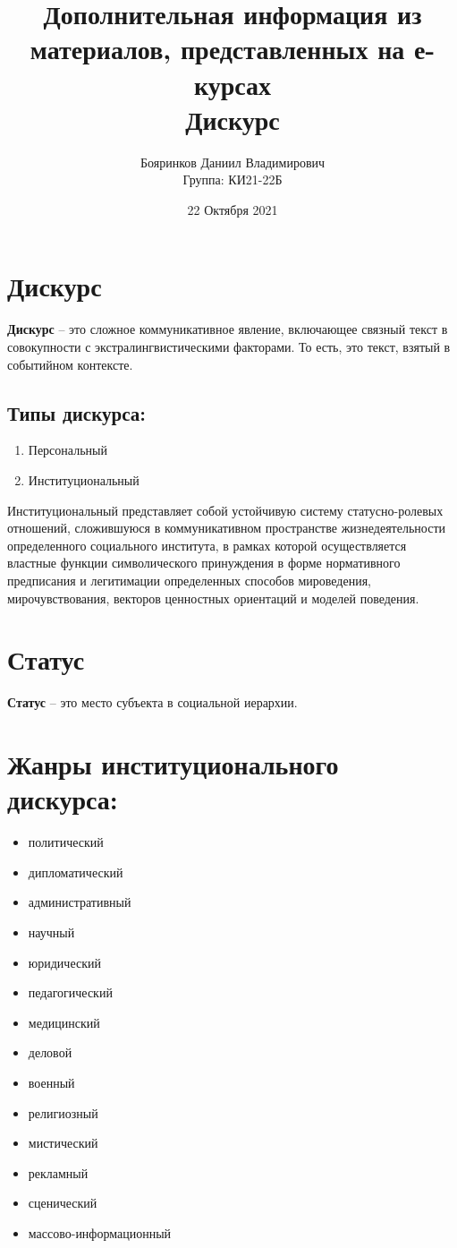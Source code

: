 \documentclass[a4paper,14pt,titlepage]{article}
\title{Дополнительная информация из материалов, представленных на е-курсах \\ Дискурс}
\author{Бояринков Даниил Владимирович \\ Группа: КИ21-22Б}
\date{22 Октября 2021}
\begin{document}
	\maketitle
	\setcounter{page}{2}
	\centering
	\tableofcontents
	\newpage
	
	\section{Дискурс}
	\textbf{Дискурс} -- это сложное коммуникативное явление, включающее связный текст в совокупности с экстралингвистическими факторами. То есть, это текст, взятый в событийном контексте.
	
	\subsection{Типы дискурса: }
	\justifying
	\begin{enumerate}
		\item Персональный
		\item Институциональный
	\end{enumerate}
	Институциональный представляет собой устойчивую систему статусно-ролевых отношений, сложившуюся в коммуникативном пространстве жизнедеятельности определенного социального института, в рамках которой осуществляется властные функции символического принуждения в форме нормативного предписания и легитимации определенных способов мироведения, мирочувствования, векторов ценностных ориентаций и моделей поведения.
	
	\section{Статус}
	\textbf{Статус} -- это место субъекта в социальной иерархии.
	\section{Жанры институционального дискурса: }
	\begin{itemize}
		\item политический
		\item дипломатический
		\item административный
		\item научный
		\item юридический
		\item педагогический
		\item медицинский
		\item деловой
		\item военный
		\item религиозный
		\item мистический
		\item рекламный
		\item сценический
		\item массово-информационный
	\end{itemize}	
	
\end{document}
